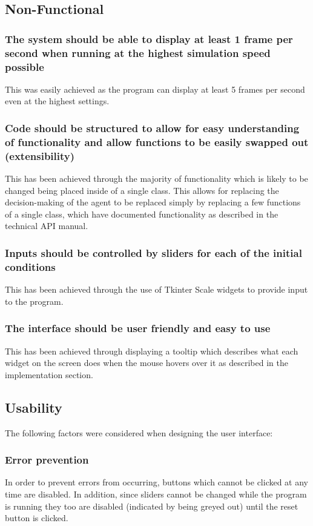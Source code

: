 \documentclass[12pt]{article}
\begin{document}
		\subsection{Non-Functional}
			\subsubsection{The system should be able to display at least 1 frame per second when running at the highest simulation speed possible}
				This was easily achieved as the program can display at least 5 frames per second even at the highest settings.
			\subsubsection{Code should be structured to allow for easy understanding of functionality and allow functions to be easily swapped out (extensibility)}
				This has been achieved through the majority of functionality which is likely to be changed being placed inside of a single class. This allows for replacing the decision-making of the agent to be replaced simply by replacing a few functions of a single class, which have documented functionality as described in the technical API manual.
			\subsubsection{Inputs should be controlled by sliders for each of the initial conditions}
				This has been achieved through the use of Tkinter Scale widgets to provide input to the program.
			\subsubsection{The interface should be user friendly and easy to use}
				This has been achieved through displaying a tooltip which describes what each widget on the screen does when the mouse hovers over it as described in the implementation section.	
			
		\subsection{Usability}
			The following factors were considered when designing the user interface:
			\subsubsection{Error prevention}
				In order to prevent errors from occurring, buttons which cannot be clicked at any time are disabled. In addition, since sliders cannot be changed while the program is running they too are disabled (indicated by being greyed out) until the reset button is clicked. 
\end{document}
